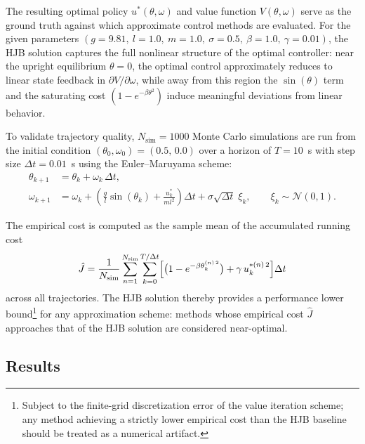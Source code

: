 The resulting optimal policy $u^*(\theta,\omega)$ and value function $V(\theta,\omega)$ serve as the ground truth against which approximate control methods are evaluated. For the given parameters $(g = 9.81,\ l = 1.0,\ m = 1.0,\ \sigma = 0.5,\ \beta = 1.0,\ \gamma = 0.01)$, the HJB solution captures the full nonlinear structure of the optimal controller: near the upright equilibrium $\theta = 0$, the optimal control approximately reduces to linear state feedback in $\partial V/\partial\omega$, while away from this region the $\sin(\theta)$ term and the saturating cost $(1 - e^{-\beta\theta^2})$ induce meaningful deviations from linear behavior.

To validate trajectory quality, $N_{\mathrm{sim}} = 1000$ Monte Carlo simulations are run from the initial condition $(\theta_0,\omega_0) = (0.5,\,0.0)$ over a horizon of $T = 10$~s with step size $\Delta t = 0.01$~s using the Euler--Maruyama scheme:
\begin{align}
    \theta_{k+1} &= \theta_k + \omega_k\,\Delta t, \label{eq:em1}\\
    \omega_{k+1} &= \omega_k 
        + \left(\frac{g}{l}\sin(\theta_k) + \frac{u^*_k}{ml^2}\right)\Delta t
        + \sigma\sqrt{\Delta t}\;\xi_k, \qquad \xi_k \sim \mathcal{N}(0,1).
    \label{eq:em2}
\end{align}

The empirical cost is computed as the sample mean of the accumulated running cost
\begin{equation}
    \hat{J} = \frac{1}{N_{\mathrm{sim}}}\sum_{n=1}^{N_{\mathrm{sim}}}
    \sum_{k=0}^{T/\Delta t}
    \Bigl[\bigl(1 - e^{-\beta\theta_k^{(n)\,2}}\bigr) + \gamma\,u_k^{*(n)\,2}\Bigr]\Delta t
    \label{eq:empirical_cost}
\end{equation}
across all trajectories. The HJB solution thereby provides a performance lower bound\footnote{Subject to the finite-grid discretization error of the value iteration scheme; any method achieving a strictly lower empirical cost than the HJB baseline should be treated as a numerical artifact.} for any approximation scheme: methods whose empirical cost $\hat{J}$ approaches that of the HJB solution are considered near-optimal.

\subsection{Results}
